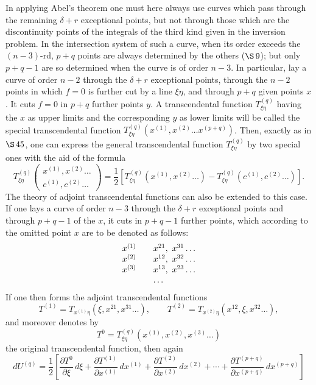 \documentclass[10pt]{article}
\begin{document}
In applying Abel's theorem one must here always use curves which pass through the remaining \(\delta+r\) exceptional points, but not through those which are the discontinuity points of the integrals of the third kind given in the inversion problem. In the intersection system of such a curve, when its order exceeds the \((n-3)\)-rd, \(p+q\) points are always determined by the others (\(\S\,9\)); but only \(p+q-1\) are so determined when the curve is of order \(n-3\). In particular, lay a curve of order \(n-2\) through the \(\delta+r\) exceptional points, through the \(n-2\) points in which \(f=0\) is further cut by a line \(\xi\eta\), and through \(p+q\) given points \(x\). It cuts \(f=0\) in \(p+q\) further points \(y\). A transcendental function \(T_{\xi\eta}^{(q)}\) having the \(x\) as upper limits and the corresponding \(y\) as lower limits will be called the special transcendental function \(T_{\xi\eta}^{(q)}(x^{(1)},x^{(2)}\ldots x^{(p+q)})\). Then, exactly as in \(\S\,45\), one can express the general transcendental function \(T_{\xi\eta}^{(q)}\) by two special ones with the aid of the formula
\[
T_{\xi\eta}^{(q)}
\begin{pmatrix}
x^{(1)},x^{(2)}\ldots\\
c^{(1)},c^{(2)}\ldots
\end{pmatrix}
=\frac12\left[
T_{\xi\eta}^{(q)}(x^{(1)},x^{(2)}\ldots)
-
T_{\xi\eta}^{(q)}(c^{(1)},c^{(2)}\ldots)
\right].
\]
The theory of adjoint transcendental functions can also be extended to this case. If one lays a curve of order \(n-3\) through the \(\delta+r\) exceptional points and through \(p+q-1\) of the \(x\), it cuts in \(p+q-1\) further points, which according to the omitted point \(x\) are to be denoted as follows:
\[
\begin{array}{c@{\qquad}l}
x^{(1)}&x^{21},\ x^{31}\ldots\\
x^{(2)}&x^{12},\ x^{32}\ldots\\
x^{(3)}&x^{13},\ x^{23}\ldots\\
&\ldots
\end{array}
\]
If one then forms the adjoint transcendental functions
\[
T^{(1)}=T_{x^{(1)}\eta}(\xi,x^{21},x^{31}\ldots),
\qquad
T^{(2)}=T_{x^{(2)}\eta}(x^{12},\xi,x^{32}\ldots),
\]
and moreover denotes by
\[
T^0=T_{\xi\eta}^{(q)}(x^{(1)},x^{(2)},x^{(3)}\ldots)
\]
the original transcendental function, then again
\[
dU^{(q)}=\frac12\left[
\frac{\partial T^0}{\partial\xi}\,d\xi
+\frac{\partial T^{(1)}}{\partial x^{(1)}}\,dx^{(1)}
+\frac{\partial T^{(2)}}{\partial x^{(2)}}\,dx^{(2)}
+\cdots+
\frac{\partial T^{(p+q)}}{\partial x^{(p+q)}}\,dx^{(p+q)}
\right]
\]
\end{document}
